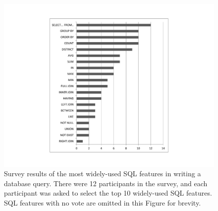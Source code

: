 
\begin{figure}[t]
  \centering
  \includegraphics[scale=0.50]{survey}
  \vspace*{-3.0ex}\caption {{\label{fig:survey}
  Survey results of the most widely-used SQL features
  in writing a database query. There were 12 participants
  in the survey, and each participant was asked to
  select the top 10 widely-used SQL features.
  SQL features with no vote are omitted in this Figure
  for brevity.
}}
\end{figure}

\newcommand{\q}{\langle query\rangle}
\newcommand{\db}{\langle db\rangle}
\newcommand{\pat}{\langle pat\rangle}
\newcommand{\bug}{\langle bug\rangle}
\newcommand{\dist}{\langle distance\rangle}
\newcommand{\sem}[1]{\llbracket #1\rrbracket}
\newcommand{\lit}[1]{\texttt{#1}}

\newcommand{\column}{\langle column\rangle}
\newcommand{\dbtable}{\langle table\rangle}
\newcommand{\cond}{\langle cond\rangle}
\newcommand{\op}{\langle op\rangle}
\newcommand{\e}{\langle expr\rangle}
\newcommand{\ce}{\langle cexpr\rangle}

